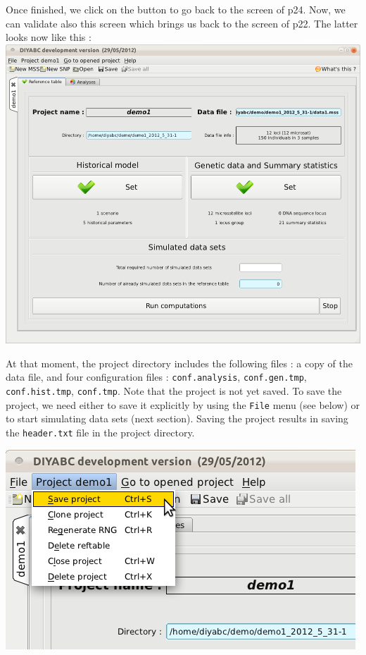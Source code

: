 Once finished, we click on the  button to
go back to the screen of p24. Now, we can validate also this screen
which brings us back to the screen of p22. The latter looks now like
this : \\


\includegraphics[scale=0.35]{gui_pictures/Capture-DIYABC-22}

At that moment, the project directory includes the following files
: a copy of the data file, and four configuration files : \texttt{conf.analysis},
\texttt{conf.gen.tmp}, \texttt{conf.hist.tmp}, \texttt{conf.tmp}.
Note that the project is not yet saved. To save the project, we need
either to save it explicitly by using the \texttt{File} menu (see
below) or to start simulating data sets (next section). Saving the
project results in saving the \texttt{header.txt} file in the project
directory.

\includegraphics[scale=0.35]{gui_pictures/Capture-DIYABC-23}


